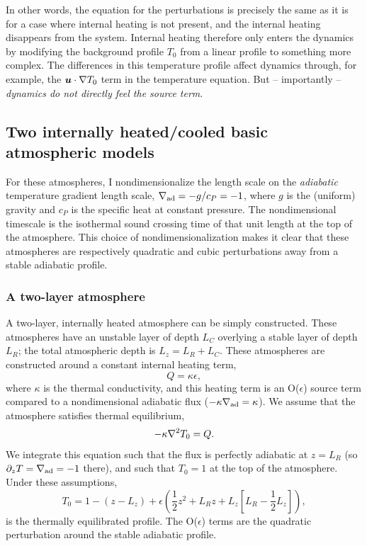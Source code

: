 In other words, the equation for the perturbations is precisely the same as it is for a case where internal heating is not present, and the internal heating disappears from the system.
Internal heating therefore only enters the dynamics by modifying the background profile $T_0$ from a linear profile to something more complex.
The differences in this temperature profile affect dynamics through, for example, the $\bm{u}\cdot\nabla T_0$ term in the temperature equation.
But -- importantly -- \emph{dynamics do not directly feel the source term}.

\subsection{Two internally heated/cooled basic atmospheric models}
\label{sec:atmospheres}
For these atmospheres, I nondimensionalize the length scale on the \emph{adiabatic} temperature gradient length scale, $\nabla_{\text{ad}} = -g/c_P = -1$, where $g$ is the (uniform) gravity and $c_P$ is the specific heat at constant pressure.
The nondimensional timescale is the isothermal sound crossing time of that unit length at the top of the atmosphere.
This choice of nondimensionalization makes it clear that these atmospheres are respectively quadratic and cubic perturbations away from a stable adiabatic profile.

\subsubsection{A two-layer atmosphere}
A two-layer, internally heated atmosphere can be simply constructed.
These atmospheres have an unstable layer of depth $L_C$ overlying a stable layer of depth $L_R$; the total atmospheric depth is $L_z = L_R + L_C$.
These atmospheres are constructed around a constant internal heating term,
\begin{equation}
Q = \kappa \epsilon,
\end{equation}
where $\kappa$ is the thermal conductivity, and this heating term is an O($\epsilon$) source term compared to a nondimensional adiabatic flux ($-\kappa\nabla_{\text{ad}} = \kappa$).
We assume that the atmosphere satisfies thermal equilibrium,
$$
-\kappa \nabla^2 T_0 = Q.
$$
We integrate this equation such that the flux is perfectly adiabatic at $z = L_R$ (so $\partial_z T = \nabla_{\text{ad}} = -1$ there), and such that $T_0 = 1$ at the top of the atmosphere.
Under these assumptions,
\begin{equation}
T_0 = 1 - (z - L_z) + \epsilon\left(\frac{1}{2} z^2 + L_R z + L_z \left[L_R - \frac{1}{2}L_z\right]\right),
\end{equation}
is the thermally equilibrated profile.
The O($\epsilon$) terms are the quadratic perturbation around the stable adiabatic profile.



